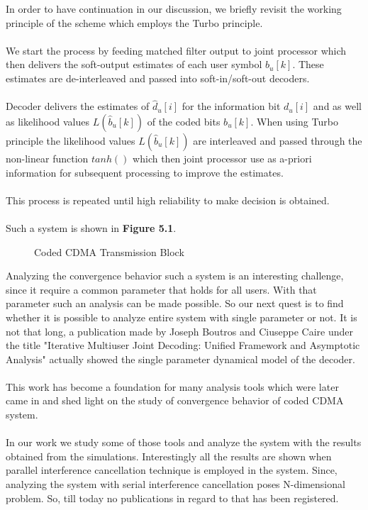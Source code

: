 In order to have continuation in our discussion, we briefly revisit the working principle of the scheme which employs the Turbo principle.\\ \\
We start the process by feeding matched filter output to joint processor which then delivers the soft-output estimates of each user symbol $b_u[k]$. These estimates are de-interleaved and passed into soft-in/soft-out decoders. \\ \\
Decoder delivers the estimates of $\hat{d}_u[i]$ for the information bit $d_u[i]$ and as well as likelihood values $L(\hat{b}_u[k])$ of the coded bits $b_u[k]$. When using Turbo principle the likelihood values $L(\hat{b}_u[k])$ are interleaved and passed through the non-linear function $tanh()$ which then joint processor use as a-priori information for subsequent processing to improve the estimates.\\ \\ This process is repeated until high reliability to make decision is obtained.\\ \\
Such a system is shown in \textbf{Figure 5.1}.
\begin{figure}[htb]
\centerline{  }
\caption{Coded CDMA Transmission Block}
\end{figure}
Analyzing the convergence behavior such a system is an interesting challenge, since it require a common parameter that holds for all users. With that parameter such an analysis can be made possible. So our next quest is to find whether it is possible to analyze entire system with single parameter or not. It is not that long, a publication made by Joseph Boutros and Ciuseppe Caire under the title "Iterative Multiuser Joint Decoding: Unified Framework and Asymptotic Analysis" actually showed the single parameter dynamical model of the decoder. \\ \\
This work has become a foundation for many analysis tools which were later came in and shed light on the study of convergence behavior of coded CDMA system.\\ \\
In our work we study some of those tools and analyze the system with the results obtained from the simulations. Interestingly all the results are shown when parallel interference cancellation technique is employed in the system. Since, analyzing the system with serial interference cancellation poses N-dimensional problem. So, till today no publications in regard to that has been registered. \\ \\
